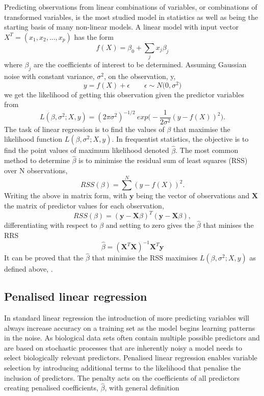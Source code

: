 \documentclass[../main.tex]{subfiles}
\begin{document}
Predicting observations from linear combinations of variables, or combinations of transformed variables, is the most studied model in statistics as well as being the starting basis of many non-linear models.
A linear model with input vector $X^T = (x_1, x_2, ..., x_p)$ has the form
$$f(X) = \beta_0 +\sum_j x_j\beta_j$$
where $\beta_j$ are the coefficients of interest to be determined.
Assuming Gaussian noise with constant variance, $\sigma^2$, on the observation, y, 
$$y = f(X) + \epsilon \qquad \epsilon \sim N \big(0,\sigma^2\big) $$
we get the likelihood of getting this observation given the predictor variables from
$$L(\beta,\sigma^2;X,y)=(2\pi\sigma^2)^{-1/2}\ exp\Big( -\frac{1}{2\sigma^2} (y-f(X))^2 \Big).$$
The task of linear regression is to find the values of $\beta$ that maximise the likelihood function $L(\beta,\sigma^2;X,y)$.
In frequentist statistics, the objective is to find the point values of maximum likelihood denoted $\hat\beta$.
The most common method to determine $\hat\beta$ is to minimise the residual sum of least squares (RSS) over N observations,
$$RSS(\beta) = \sum^N(y-f(X))^2.$$
Writing the above in matrix form, with $\mathbf{y}$ being the vector of observations and $\mathbf{X}$ the matrix of predictor values for each observation,
$$RSS(\beta) = (\mathbf{y}-\mathbf{X}\beta)^T(\mathbf{y}-\mathbf{X}\beta),$$
differentiating with respect to $\beta$ and setting to zero gives the $\hat\beta$ that minises the RRS
$$\hat\beta = (\mathbf{X}^T\mathbf{X})^{-1}\mathbf{X}^T\mathbf{y}$$
It can be proved that the $\hat\beta$ that minimise the RSS maximises $L(\beta,\sigma^2;X,y)$ as defined above, \parencite{Hastie2009}.

\subsection{Penalised linear regression}

In standard linear regression the introduction of more predicting variables will always increase accuracy on a training set as the model begins learning patterns in the noise.
As biological data sets often contain multiple possible predictors and are based on stochastic processes that are inherently noisy a model needs to select biologically relevant predictors.
Penalised linear regression enables variable selection by introducing additional terms to the likelihood that penalise the inclusion of predictors.
The penalty acts on the coefficients of all predictors creating penalised coefficients, $\hat{\beta}$, with general definition
\end{document}
